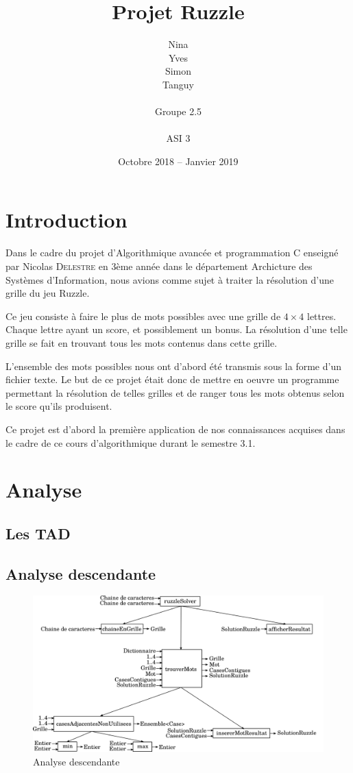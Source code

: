 \documentclass[a4paper]{report}
\title{Projet Ruzzle}
\author{
	\Large Nina \noun{Lardière} \\
	\Large Yves \noun{Le Guennec} \\
	\Large Simon \noun{Lebeaud} \\
	\Large Tanguy \noun{Leclerc} \\ \\
	\Large Groupe 2.5 \\ \\
	\Large ASI 3 \\
	}
\date{\Large Octobre 2018 -- Janvier 2019}
\newcommand{\noun}[1]{\textsc{#1}}
\begin{document}
	 \maketitle
	\tableofcontents

	\chapter*{Introduction}
	{\large Dans le cadre du projet d'Algorithmique avancée et programmation C enseigné par Nicolas \noun{Delestre} en 3ème année dans le département Archicture des Systèmes d'Information, nous avions comme sujet à traiter la résolution d'une grille du jeu Ruzzle.

	Ce jeu consiste à faire le plus de mots possibles avec une grille de $4\times4$ lettres. Chaque lettre ayant un score, et possiblement un bonus. La résolution d'une telle grille se fait en trouvant tous les mots contenus dans cette grille.

	L'ensemble des mots possibles nous ont d'abord été transmis sous la forme d'un fichier texte. Le but de ce projet était donc de mettre en oeuvre un programme permettant la résolution de telles grilles et de ranger tous les mots obtenus selon le score qu'ils produisent.

	Ce projet est d'abord la première application de nos connaissances acquises dans le cadre de ce cours d'algorithmique durant le semestre 3.1.}

	\chapter{Analyse}
		\section{Les TAD}
			

		\section{Analyse descendante}
			\begin{figure}[h]
				\centering \includegraphics[width=1\textwidth]{./analyseDescendante/analyseDescendante}
				\caption{\label{fig:AD}Analyse descendante}
			\end{figure}
\end{document}
